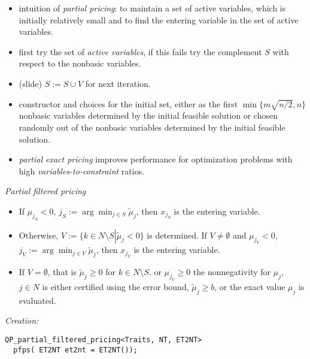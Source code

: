 \documentclass{slides}
\begin{document}
\begin{note}
\begin{itemize}
\item intuition of \emph{partial pricing}: to maintain a set of active
variables, which is initially relatively small and to find the entering
variable in the set of active variables.
\item first try the set of \emph{active variables}, if this fails try the
complement $S$ with respect to the nonbasic variables.
\item (slide) $S:=S \cup V$ for next iteration. 
\item constructor and choices for the initial set, either as the first
$\min\{m\sqrt{n/2},n\}$ nonbasic variables determined by the initial feasible
solution or chosen randomly out of the nonbasic variables determined by the
initial feasible solution. 
\item \emph{partial exact pricing} improves performance for optimization
problems with high \emph{variables-to-constraint} ratios.
\end{itemize}
\end{note}


\begin{slide}
\emph{Partial filtered pricing}

\begin{itemize}
\item If $\mu_{j_{S}} < 0$, $j_{S}:=\arg\min_{j \in S}\tilde{\mu}_{j}$, then
$x_{j_{S}}$ is the entering variable.

\item Otherwise, $V:=\{k \in N \setminus S \left|\right. \tilde{\mu}_{j} <0\}$
is determined. If $V \neq \emptyset$ and $\mu_{j_{V}} <0$,
$j_{V}:=\arg\min_{j \in V}\tilde{\mu}_{j}$, then $x_{j_{V}}$ is the entering
variable.

\item If $V=\emptyset$, that is
$\tilde{\mu}_{j} \geq 0$ for $k \in N \setminus S$, or $\mu_{j_{V}} \geq 0$
the nonnegativity for
$\mu_{j}$, $j \in N$ is
either certified using the error bound, $\tilde{\mu}_{j} \geq b$,
or the exact value $\mu_{j}$ is evaluated.
\end{itemize}

\emph{Creation:}
\begin{verbatim}
QP_partial_filtered_pricing<Traits, NT, ET2NT>
  pfps( ET2NT et2nt = ET2NT());
\end{verbatim}
\end{slide}
\end{document}
